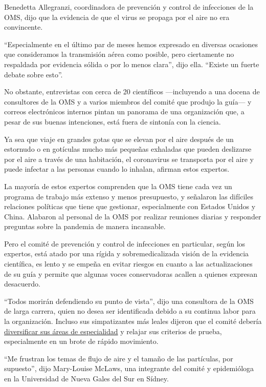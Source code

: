 Benedetta Allegranzi, coordinadora de prevención y control de
infecciones de la OMS, dijo que la evidencia de que el virus se propaga
por el aire no era convincente.

``Especialmente en el último par de meses hemos expresado en diversas
ocasiones que consideramos la transmisión aérea como posible, pero
ciertamente no respaldada por evidencia sólida o por lo menos clara'',
dijo ella. ``Existe un fuerte debate sobre esto''.

No obstante, entrevistas con cerca de 20 científicos ---incluyendo a una
docena de consultores de la OMS y a varios miembros del comité que
produjo la guía--- y correos electrónicos internos pintan un panorama de
una organización que, a pesar de sus buenas intenciones, está fuera de
sintonía con la ciencia.

Ya sea que viaje en grandes gotas que se elevan por el aire después de
un estornudo o en gotículas mucho más pequeñas exhaladas que pueden
deslizarse por el aire a través de una habitación, el coronavirus se
transporta por el aire y puede infectar a las personas cuando lo
inhalan, afirman estos expertos.

La mayoría de estos expertos comprenden que la OMS tiene cada vez un
programa de trabajo más extenso y menos presupuesto, y señalaron las
difíciles relaciones políticas que tiene que gestionar, especialmente
con Estados Unidos y China. Alabaron al personal de la OMS por realizar
reuniones diarias y responder preguntas sobre la pandemia de manera
incansable.

Pero el comité de prevención y control de infecciones en particular,
según los expertos, está atado por una rígida y sobremedicalizada visión
de la evidencia científica, es lento y se empeña en evitar riesgos en
cuanto a las actualizaciones de su guía y permite que algunas voces
conservadoras acallen a quienes expresan desacuerdo.

``Todos morirán defendiendo su punto de vista'', dijo una consultora de
la OMS de larga carrera, quien no desea ser identificada debido a su
continua labor para la organización. Incluso sus simpatizantes más
leales dijeron que el comité debería
\href{https://twitter.com/JoyAgnost/status/1263802269658644480}{diversificar
sus áreas de especialidad} y relajar sus criterios de prueba,
especialmente en un brote de rápido movimiento.

``Me frustran los temas de flujo de aire y el tamaño de las partículas,
por supuesto'', dijo Mary-Louise McLaws, una integrante del comité y
epidemióloga en la Universidad de Nueva Gales del Sur en Sídney.

